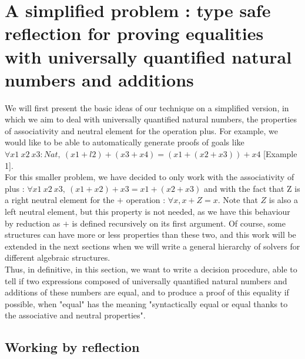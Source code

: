 \section{A simplified problem : type safe reflection for proving equalities with universally quantified natural numbers and additions}


We will first present the basic ideas of our technique on a simplified version, in which we aim to deal with universally quantified natural numbers, the properties of associativity and neutral element for the operation plus.
For example, we would like to be able to automatically generate proofs of goals like $\forall x1\ x2\ x3:Nat,\ (x1 + l2) + (x3 + x4) = (x1 + (x2 + x3)) + x4$ [Example 1]. \\
For this smaller problem, we have decided to only work with the associativity of plus : $\forall x1\ x2\ x3,\ (x1 + x2) + x3 = x1 + (x2 + x3)$ and with the fact that Z is a right neutral element for the $+$ operation : $\forall x, x + Z = x$. Note that $Z$ is also a left neutral element, but this property is not needed, as we have this behaviour by reduction as $+$ is defined recursively on its first argument. Of course, some structures can have more or less properties than these two, and this work will be extended in the next sections when we will write a general hierarchy of solvers for different algebraic structures. \\
Thus, in definitive, in this section, we want to write a decision procedure, able to tell if two expressions composed of universally quantified natural numbers and additions of these numbers are equal, and to produce a proof of this equality if possible, when "equal" has the meaning "syntactically equal or equal thanks to the associative and neutral properties".


\subsection{Working by reflection}

